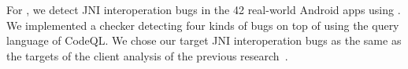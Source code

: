 

For , we detect JNI interoperation bugs in the 42 real-world Android
apps using \ours. 
We implemented a checker detecting four kinds of bugs on top of \ours using the
query language of CodeQL. We chose our target JNI interoperation bugs as the
same as the targets of the client analysis of the previous
research~\cite{LeeASE20, ILEA}.

